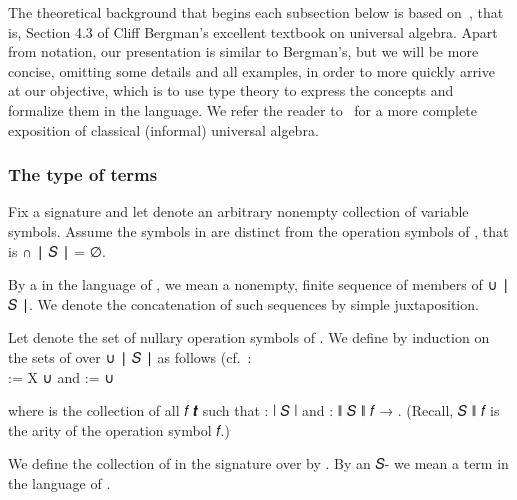 The theoretical background that begins each subsection below is based on~\cite[\S4.3]{Bergman:2012}, that is, Section 4.3 of Cliff Bergman's excellent textbook on universal algebra. Apart from notation, our presentation is similar to Bergman's, but we will be more concise, omitting some details and all examples, in order to more quickly arrive at our objective, which is to use type theory to express the concepts and formalize them in the \agda language. We refer the reader to~\cite{Bergman:2012} for a more complete exposition of classical (informal) universal algebra.

\subsubsection{The type of terms}\label{the-type-of-terms}

Fix a signature  and let  denote an arbitrary nonempty collection of variable symbols. Assume the symbols in  are distinct from the operation symbols of , that is  \af ∩ \af ∣ \ab 𝑆 \af ∣ \as = \aic ∅.

By a  in the language of , we mean a nonempty, finite sequence of members of  \af ∪ \af ∣ \ab 𝑆 \af ∣. We denote the concatenation of such sequences by simple juxtaposition.

Let  denote the set of nullary operation symbols of . We define by induction on  the sets  of  over  \af ∪ \af ∣ \ab 𝑆 \af ∣ as follows (cf.~\cite[Def. 4.19]{Bergman:2012}:\\[-4pt]

 := \ab X \af ∪  and  :=  \af ∪ 

where  is the collection of all \ab 𝑓 \ab 𝒕 such that  \as : \af ∣ \ab 𝑆 \af ∣ and  \as : \af ∥ \ab 𝑆 \af ∥ \ab 𝑓 \as → . (Recall,  \ab 𝑆 \af ∥ \ab 𝑓 is the arity of the operation symbol \ab 𝑓.)

We define the collection of  in the signature  over  by . By an 𝑆- we mean a term in the language of .

